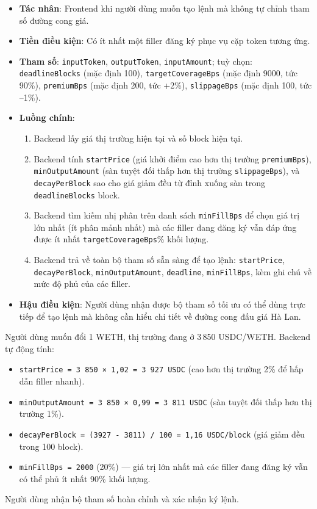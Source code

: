 \documentclass[../DoAn.tex]{subfiles}
\begin{document}
\begin{itemize}
    \item \textbf{Tác nhân}: Frontend khi người dùng muốn tạo lệnh mà không tự chỉnh tham số đường cong giá.
    \item \textbf{Tiền điều kiện}: Có ít nhất một filler đăng ký phục vụ cặp token tương ứng.
    \item \textbf{Tham số}: \texttt{inputToken}, \texttt{outputToken}, \texttt{inputAmount}; tuỳ chọn: \texttt{deadlineBlocks} (mặc định 100), \texttt{targetCoverageBps} (mặc định 9000, tức 90\%), \texttt{premiumBps} (mặc định 200, tức +2\%), \texttt{slippageBps} (mặc định 100, tức --1\%).
    \item \textbf{Luồng chính}:
    \begin{enumerate}
        \item Backend lấy giá thị trường hiện tại và số block hiện tại.
        \item Backend tính \texttt{startPrice} (giá khởi điểm cao hơn thị trường \texttt{premiumBps}), \texttt{minOutputAmount} (sàn tuyệt đối thấp hơn thị trường \texttt{slippageBps}), và \texttt{decayPerBlock} sao cho giá giảm đều từ đỉnh xuống sàn trong \texttt{deadlineBlocks} block.
        \item Backend tìm kiếm nhị phân trên danh sách \texttt{minFillBps} để chọn giá trị lớn nhất (ít phân mảnh nhất) mà các filler đang đăng ký vẫn đáp ứng được ít nhất \texttt{targetCoverageBps}\% khối lượng.
        \item Backend trả về toàn bộ tham số sẵn sàng để tạo lệnh: \texttt{startPrice}, \texttt{decayPerBlock}, \texttt{minOutputAmount}, \texttt{deadline}, \texttt{minFillBps}, kèm ghi chú về mức độ phủ của các filler.
    \end{enumerate}
    \item \textbf{Hậu điều kiện}: Người dùng nhận được bộ tham số tối ưu có thể dùng trực tiếp để tạo lệnh mà không cần hiểu chi tiết về đường cong đấu giá Hà Lan.
\end{itemize}

\begin{example}
Người dùng muốn đổi 1 WETH, thị trường đang ở 3\,850 USDC/WETH. Backend tự động tính:
\begin{itemize}
    \item \texttt{startPrice = 3\,850 × 1{,}02 = 3\,927 USDC} (cao hơn thị trường 2\% để hấp dẫn filler nhanh).
    \item \texttt{minOutputAmount = 3\,850 × 0{,}99 = 3\,811 USDC} (sàn tuyệt đối thấp hơn thị trường 1\%).
    \item \texttt{decayPerBlock = (3927 - 3811) / 100 = 1,16 USDC/block} (giá giảm đều trong 100 block).
    \item \texttt{minFillBps = 2000} (20\%) — giá trị lớn nhất mà các filler đang đăng ký vẫn có thể phủ ít nhất 90\% khối lượng.
\end{itemize}
Người dùng nhận bộ tham số hoàn chỉnh và xác nhận ký lệnh.
\end{example}
\end{document}
